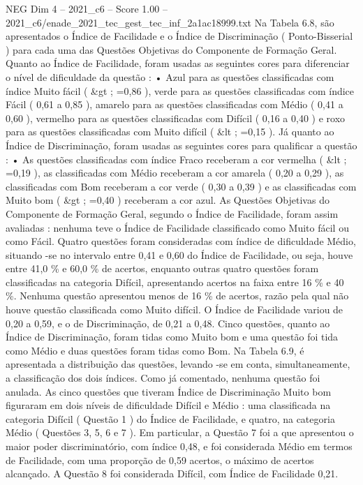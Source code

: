 \begin{textsample}{NEG Dim 4 – 2021\_c6 – Score 1.00 – 2021\_c6/enade\_2021\_tec\_gest\_tec\_inf\_2a1ac18999.txt}
Na Tabela 6.8, são apresentados o Índice de Facilidade e o Índice de Discriminação ( Ponto-Bisserial ) para cada uma das Questões Objetivas do Componente de Formação Geral.
Quanto ao Índice de Facilidade, foram usadas as seguintes cores para diferenciar o nível de dificuldade da questão : • Azul para as questões classificadas com índice Muito fácil ( \&gt ; =0,86 ), verde para as questões classificadas com índice Fácil ( 0,61 a 0,85 ), amarelo para as questões classificadas com Médio ( 0,41 a 0,60 ), vermelho para as questões classificadas com Difícil ( 0,16 a 0,40 ) e roxo para as questões classificadas com Muito difícil ( \&lt ; =0,15 ).
Já quanto ao Índice de Discriminação, foram usadas as seguintes cores para qualificar a questão : • As questões classificadas com índice Fraco receberam a cor vermelha ( \&lt ; =0,19 ), as classificadas com Médio receberam a cor amarela ( 0,20 a 0,29 ), as classificadas com Bom receberam a cor verde ( 0,30 a 0,39 ) e as classificadas com Muito bom ( \&gt ; =0,40 ) receberam a cor azul.
As Questões Objetivas do Componente de Formação Geral, segundo o Índice de Facilidade, foram assim avaliadas : nenhuma teve o Índice de Facilidade classificado como Muito fácil ou como Fácil.
Quatro questões foram consideradas com índice de dificuldade Médio, situando -se no intervalo entre 0,41 e 0,60 do Índice de Facilidade, ou seja, houve entre 41,0 \% e 60,0 \% de acertos, enquanto outras quatro questões foram classificadas na categoria Difícil, apresentando acertos na faixa entre 16 \% e 40 \%.
Nenhuma questão apresentou menos de 16 \% de acertos, razão pela qual não houve questão classificada como Muito difícil.
O Índice de Facilidade variou de 0,20 a 0,59, e o de Discriminação, de 0,21 a 0,48.
Cinco questões, quanto ao Índice de Discriminação, foram tidas como Muito bom e uma questão foi tida como Médio e duas questões foram tidas como Bom.
Na Tabela 6.9, é apresentada a distribuição das questões, levando -se em conta, simultaneamente, a classificação dos dois índices.
Como já comentado, nenhuma questão foi anulada.
As cinco questões que tiveram Índice de Discriminação Muito bom figuraram em dois níveis de dificuldade Difícil e Médio : uma classificada na categoria Difícil ( Questão 1 ) do Índice de Facilidade, e quatro, na categoria Médio ( Questões 3, 5, 6 e 7 ).
Em particular, a Questão 7 foi a que apresentou o maior poder discriminatório, com índice 0,48, e foi considerada Médio em termos de Facilidade, com uma proporção de 0,59 acertos, o máximo de acertos alcançado.
A Questão 8 foi considerada Difícil, com Índice de Facilidade 0,21.

\end{textsample}
